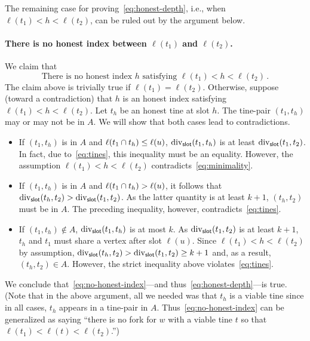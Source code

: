     The remaining case for proving~\eqref{eq:honest-depth}, 
    i.e., when $\ell(t_1) < h < \ell(t_2)$, 
    can be ruled out by the argument below.




    \paragraph{There is no honest index between $\ell(t_1)$ and $\ell(t_2)$.}
    We claim that 
    \begin{equation}\label{eq:no-honest-index}
        \text{There is no honest index $h$ satisfying $\ell(t_1) < h < \ell(t_2)$}
        \,.
    \end{equation}
    The claim above is trivially true if $\ell(t_1) = \ell(t_2)$.
    Otherwise, suppose (toward a contradiction) 
    that $h$ is an honest index satisfying $\ell(t_1) < h < \ell(t_2)$. 
    Let $t_h$ be an honest tine at slot $h$. 
    The tine-pair $(t_1, t_h)$ may or may not be in $A$. 
    We will show that both cases lead to contradictions.
    \begin{itemize}
      \item If $(t_1, t_h)$ is in $A$ and $\ell(t_1 \cap t_h) \leq \ell(u)$, 
      $\mathrm{div}_{\mathsf{slot}}(t_1, t_h)$ is at least $\mathrm{div}_{\mathsf{slot}}(t_1, t_2)$. 
      In fact, due to~\eqref{eq:tines}, this inequality must be an equality. 
      However, the assumption $\ell(t_1) < h < \ell(t_2)$ contradicts~\eqref{eq:minimality}. 

      \item If $(t_1, t_h)$ is in $A$ and $\ell(t_1 \cap t_h) > \ell(u)$, 
      it follows that $\mathrm{div}_{\mathsf{slot}}(t_h, t_2) > \mathrm{div}_{\mathsf{slot}}(t_1, t_2)$. 
      As the latter quantity is at least $k + 1$, $(t_h, t_2)$ must be in $A$. 
      The preceding inequality, however, contradicts~\eqref{eq:tines}.

      \item If $(t_1, t_h) \not \in A$, 
      $\mathrm{div}_{\mathsf{slot}}(t_1, t_h)$ is at most $k$.
      As $\mathrm{div}_{\mathsf{slot}}(t_1, t_2)$ is at least $k + 1$, 
      $t_h$ and $t_1$ must share a vertex after slot $\ell(u)$. 
      Since $\ell(t_1) < h < \ell(t_2)$ by assumption, 
      $\mathrm{div}_{\mathsf{slot}}(t_h, t_2) > \mathrm{div}_{\mathsf{slot}}(t_1, t_2) \geq k + 1$ 
      and, as a result, $(t_h, t_2) \in A$. 
      However, the strict inequality above violates~\eqref{eq:tines}. 
    \end{itemize}
    We conclude that~\eqref{eq:no-honest-index}---and thus~\eqref{eq:honest-depth}---is true. 
    (Note that in the above argument, all we needed was that $t_h$ is a viable tine 
    since in all cases, $t_h$ appears in a tine-pair in $A$. 
    Thus~\eqref{eq:no-honest-index} can be generalized as saying 
    ``there is no fork for $w$ with a viable tine $t$ so that $\ell(t_1) < \ell(t) < \ell(t_2)$.'')
    


